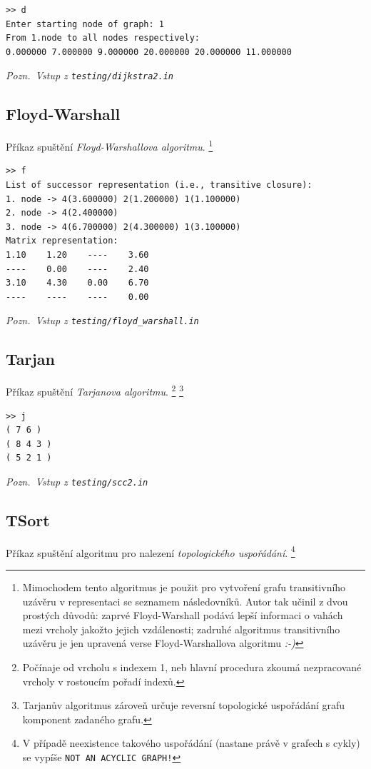 \documentclass[11pt,a4paper]{article}
\theoremstyle{remark}
\begin{document}
\begin{verbatim}
>> d
Enter starting node of graph: 1
From 1.node to all nodes respectively:
0.000000 7.000000 9.000000 20.000000 20.000000 11.000000 
\end{verbatim}

{\noindent \sl Pozn.~Vstup z \tt testing/dijkstra2.in}

\subsection{Floyd-Warshall}
Příkaz spuštění {\sl Floyd-Warshallova algoritmu\/}.%
\footnote{Mimochodem tento algoritmus je použit pro vytvoření grafu
transitivního uzávěru v representaci se seznamem následovníků.
Autor tak učinil z dvou prostých důvodů: zaprvé Floyd-Warshall podává lepší
informaci o vahách mezi vrcholy jakožto jejich vzdálenosti; zadruhé algoritmus
transitivního uzávěru je jen upravená verse Floyd-Warshallova algoritmu \sl :-)}


\begin{verbatim}
>> f
List of successor representation (i.e., transitive closure):
1. node -> 4(3.600000) 2(1.200000) 1(1.100000)
2. node -> 4(2.400000)
3. node -> 4(6.700000) 2(4.300000) 1(3.100000)
Matrix representation:
1.10    1.20    ----    3.60
----    0.00    ----    2.40
3.10    4.30    0.00    6.70
----    ----    ----    0.00
\end{verbatim}

{\noindent \sl Pozn.~Vstup z \tt testing/floyd\_warshall.in}

\subsection{Tarjan}
Příkaz spuštění {\sl Tarjanova algoritmu\/}.%
\footnote{Počínaje od vrcholu s indexem 1, neb hlavní procedura zkoumá
  nezpracované vrcholy v rostoucím pořadí indexů.}%
\footnote{Tarjanův algoritmus zároveň určuje reversní topologické uspořádání
  grafu komponent zadaného grafu.}

\begin{verbatim}
>> j
( 7 6 )
( 8 4 3 )
( 5 2 1 )
\end{verbatim}

{\noindent \sl Pozn.~Vstup z \tt testing/scc2.in}

\subsection{TSort}
Příkaz spuštění algoritmu pro nalezení {\sl topologického uspořádání\/}.%
\footnote{V případě neexistence takového uspořádání (nastane právě v grafech s
  cykly) se vypíše \tt NOT AN ACYCLIC GRAPH!}
\end{document}
